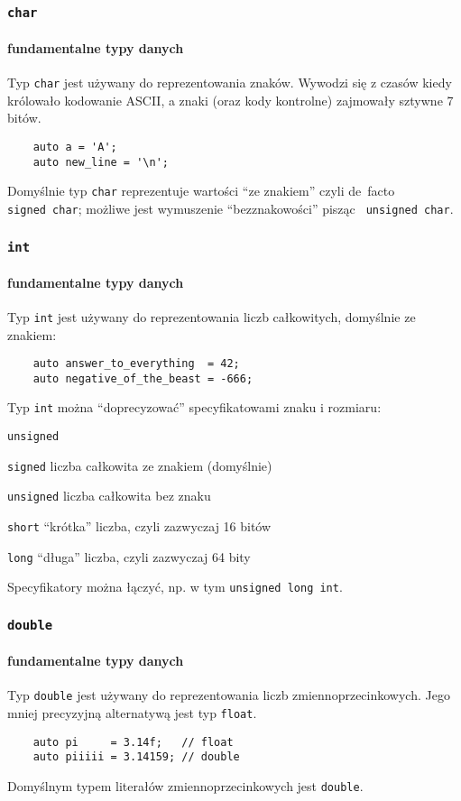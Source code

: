 \documentclass[aspectratio=169]{beamer}
\begin{document}
\begin{frame}[fragile]
    \frametitle{{\tt char}}
    \framesubtitle{fundamentalne typy danych}

    Typ {\tt char} jest używany do reprezentowania znaków. Wywodzi się z czasów
    kiedy królowało kodowanie ASCII, a znaki (oraz kody kontrolne) zajmowały
    sztywne 7 bitów.

    \begin{lstlisting}
    auto a = 'A';
    auto new_line = '\n';
    \end{lstlisting}

    Domyślnie typ {\tt char} reprezentuje wartości ``ze znakiem'' czyli de~facto
    {\tt signed~char}; możliwe jest wymuszenie ``bezznakowości'' pisząc {\tt
    unsigned~char}.
\end{frame}

\begin{frame}[fragile]
    \frametitle{{\tt int}}
    \framesubtitle{fundamentalne typy danych}

    Typ {\tt int} jest używany do reprezentowania liczb całkowitych, domyślnie
    ze znakiem:

    \begin{lstlisting}
    auto answer_to_everything  = 42;
    auto negative_of_the_beast = -666;
    \end{lstlisting}

    Typ {\tt int} można ``doprecyzować'' specyfikatowami znaku i rozmiaru:

    \begin{labeling}{{\tt unsigned}}
        \item[{\tt signed}] liczba całkowita ze znakiem (domyślnie)
        \item[{\tt unsigned}] liczba całkowita bez znaku
        \item[{\tt short}] ``krótka'' liczba, czyli zazwyczaj 16 bitów
        \item[{\tt long}] ``długa'' liczba, czyli zazwyczaj 64 bity
    \end{labeling}

    Specyfikatory można łączyć, np. w tym {\tt unsigned long int}.
\end{frame}

\begin{frame}[fragile]
    \frametitle{{\tt double}}
    \framesubtitle{fundamentalne typy danych}

    Typ {\tt double} jest używany do reprezentowania liczb zmiennoprzecinkowych.
    Jego mniej precyzyjną alternatywą jest typ {\tt float}.

    \begin{lstlisting}
    auto pi     = 3.14f;   // float
    auto piiiii = 3.14159; // double
    \end{lstlisting}

    Domyślnym typem literałów zmiennoprzecinkowych jest {\tt double}.
\end{frame}
\end{document}
